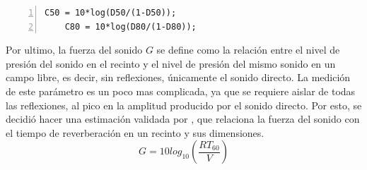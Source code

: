 \begin{lstlisting}[frame=single,numbers=left, style=Matlab-editor, basicstyle=\tiny]
    C50 = 10*log(D50/(1-D50));
    C80 = 10*log(D80/(1-D80));
\end{lstlisting}

Por ultimo, la fuerza del sonido $G$ se define como la relación entre el nivel de presión del sonido en el recinto y el nivel de presión del mismo sonido en un campo libre, es decir, sin reflexiones, únicamente el sonido directo. \hfill\break
La medición de este parámetro es un poco mas complicada, ya que se requiere aislar de todas las reflexiones, al pico en la amplitud producido por el sonido directo. Por esto, se decidió hacer una estimación validada por \cite{Rossing2007}, que relaciona la fuerza del sonido con el tiempo de reverberación en un recinto y sus dimensiones.
$$G = 10 log_{10}\left(\frac{RT_{60}}{V}\right)$$

